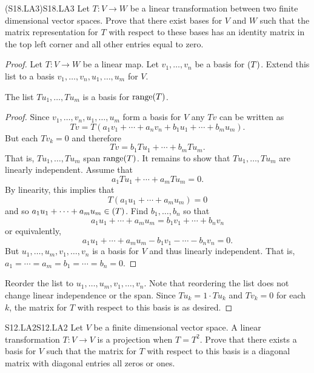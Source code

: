 \documentclass[../AlgebraQualSolutions.tex]{subfiles}
\begin{document}
	\begin{prob}{(S18.LA3)}{S18.LA3}
		Let $T: V \to W$ be a linear transformation between two finite dimensional vector spaces. Prove that there exist bases for $V$ and $W$ such that the matrix representation for $T$ with respect to these bases has an identity matrix in the top left corner and all other entries equal to zero.
	\end{prob}

	\begin{proof}
		Let $T: V \to W$ be a linear map. Let $v_1,\ldots, v_n$ be a basis for $\null(T)$. Extend this list to a basis $v_1,\ldots, v_n,u_1,\ldots,u_m$ for $V$.

		\begin{claim}
			The list $Tu_1,\ldots, Tu_m$ is a basis for $\mathrm{range}(T)$.

			\begin{proof}
				Since $v_1,\ldots, v_n,u_1,\ldots, u_m$ form a basis for $V$ any $Tv$ can be written as 
					\[Tv = T(a_1v_1 + \cdots + a_nv_n + b_1u_1 + \cdots + b_mu_m).\]
				But each $Tv_k = 0$ and therefore
					\[Tv = b_1Tu_1 + \cdots + b_mTu_m.\]
				That is, $Tu_1,\ldots, Tu_m$ span $\mathrm{range}(T)$. It remains to show that $Tu_1,\ldots, Tu_m$ are linearly independent. Assume that 
					\[a_1Tu_1 + \cdots + a_mTu_m = 0.\]
				By linearity, this implies that
					\[T(a_1u_1 + \cdots + a_mu_m) = 0\]
				and so $a_1u_1 + \cdots + a_mu_m \in \null(T)$. Find $b_1,\ldots, b_n$ so that
					\[a_1u_1 + \cdots + a_mu_m = b_1v_1 + \cdots + b_nv_n\]
				or equivalently,
				\[a_1u_1 + \cdots + a_mu_m - b_1v_1 - \cdots - b_nv_n = 0.\]
				But $u_1,\ldots,u_m,v_1,\ldots,v_n$ is a basis for $V$ and thus linearly independent. That is, $a_1 = \cdots = a_m = b_1 = \cdots = b_n = 0$.
			\end{proof}
		\end{claim}

		Reorder the list to $u_1,\ldots,u_m,v_1,\ldots, v_n$. Note that reordering the list does not change linear independence or the span. Since $Tu_k = 1\cdot Tu_k$ and $Tv_k = 0$ for each $k$, the matrix for $T$ with respect to this basis is as desired.
	\end{proof}

	\begin{prob}{S12.LA2}{S12.LA2}
		Let $V$ be a finite dimensional vector space. A linear transformation $T: V \to V$ is a projection when $T = T^2$. Prove that there exists a basis for $V$ such that the matrix for $T$ with respect to this basis is a diagonal matrix with diagonal entries all zeros or ones.
	\end{prob}
\end{document}
